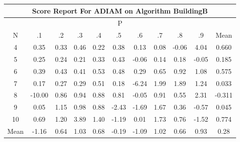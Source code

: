 \documentclass[11pt,a4paper]{report}
\begin{document}
\begin{longtable}{ | c || c | c | c | c | c | c | c | c | c || c |}
\hline
\multicolumn{11}{|c|}{ Score Report For ADIAM on Algorithm BuildingB} \\
\hline
\multicolumn{11}{|c|}{ P } \\
\hline
N & .1 & .2 & .3 & .4 & .5 & .6 & .7 & .8 & .9 & Mean\\
 \hline
 \hline
 \endhead
  4 &  \cellcolor[HTML]{F7F7FF} 0.35 &  \cellcolor[HTML]{F7F7FF} 0.33 &  \cellcolor[HTML]{F7F7FF} 0.46 &  \cellcolor[HTML]{F7F7FF} 0.22 &  \cellcolor[HTML]{F7F7FF} 0.38 &  \cellcolor[HTML]{FFFFFF} 0.13 &  \cellcolor[HTML]{FFFFFF} 0.08 &  \cellcolor[HTML]{FFFFFF} -0.06 &  \cellcolor[HTML]{9797FF} 4.04 & 0.660 \\
  5 &  \cellcolor[HTML]{F7F7FF} 0.25 &  \cellcolor[HTML]{F7F7FF} 0.24 &  \cellcolor[HTML]{F7F7FF} 0.21 &  \cellcolor[HTML]{F7F7FF} 0.33 &  \cellcolor[HTML]{F7F7FF} 0.43 &  \cellcolor[HTML]{FFFFFF} -0.06 &  \cellcolor[HTML]{FFFFFF} 0.14 &  \cellcolor[HTML]{F7F7FF} 0.18 &  \cellcolor[HTML]{FFFFFF} -0.05 & 0.185 \\
  6 &  \cellcolor[HTML]{F7F7FF} 0.39 &  \cellcolor[HTML]{F7F7FF} 0.43 &  \cellcolor[HTML]{F7F7FF} 0.41 &  \cellcolor[HTML]{EFEFFF} 0.53 &  \cellcolor[HTML]{EFEFFF} 0.48 &  \cellcolor[HTML]{F7F7FF} 0.29 &  \cellcolor[HTML]{EFEFFF} 0.65 &  \cellcolor[HTML]{E7E7FF} 0.92 &  \cellcolor[HTML]{E7E7FF} 1.08 & 0.575 \\
  7 &  \cellcolor[HTML]{F7F7FF} 0.17 &  \cellcolor[HTML]{F7F7FF} 0.27 &  \cellcolor[HTML]{F7F7FF} 0.29 &  \cellcolor[HTML]{EFEFFF} 0.51 &  \cellcolor[HTML]{F7F7FF} 0.18 &  \cellcolor[HTML]{FF6060} -6.24 &  \cellcolor[HTML]{CFCFFF} 1.99 &  \cellcolor[HTML]{CFCFFF} 1.89 &  \cellcolor[HTML]{DFDFFF} 1.24 & 0.033 \\
  8 &  \cellcolor[HTML]{FF0000} -10.00 &  \cellcolor[HTML]{E7E7FF} 0.86 &  \cellcolor[HTML]{E7E7FF} 0.94 &  \cellcolor[HTML]{E7E7FF} 0.88 &  \cellcolor[HTML]{E7E7FF} 0.81 &  \cellcolor[HTML]{FFFFFF} -0.05 &  \cellcolor[HTML]{E7E7FF} 0.91 &  \cellcolor[HTML]{EFEFFF} 0.55 &  \cellcolor[HTML]{C7C7FF} 2.31 & -0.311 \\
  9 &  \cellcolor[HTML]{FFFFFF} 0.05 &  \cellcolor[HTML]{DFDFFF} 1.15 &  \cellcolor[HTML]{E7E7FF} 0.98 &  \cellcolor[HTML]{E7E7FF} 0.88 &  \cellcolor[HTML]{FFBFBF} -2.43 &  \cellcolor[HTML]{FFD7D7} -1.69 &  \cellcolor[HTML]{D7D7FF} 1.67 &  \cellcolor[HTML]{F7F7FF} 0.36 &  \cellcolor[HTML]{FFEFEF} -0.57 & 0.045 \\
  10 &  \cellcolor[HTML]{EFEFFF} 0.69 &  \cellcolor[HTML]{DFDFFF} 1.20 &  \cellcolor[HTML]{9F9FFF} 3.89 &  \cellcolor[HTML]{DFDFFF} 1.40 &  \cellcolor[HTML]{FFDFDF} -1.19 &  \cellcolor[HTML]{FFFFFF} 0.01 &  \cellcolor[HTML]{D7D7FF} 1.73 &  \cellcolor[HTML]{EFEFFF} 0.76 &  \cellcolor[HTML]{FFD7D7} -1.52 & 0.774 \\
 \hline
 \hline
Mean &  \cellcolor[HTML]{FFDFDF} -1.16 &  \cellcolor[HTML]{EFEFFF} 0.64 &  \cellcolor[HTML]{E7E7FF} 1.03 &  \cellcolor[HTML]{EFEFFF} 0.68 &  \cellcolor[HTML]{FFF7F7} -0.19 &  \cellcolor[HTML]{FFE7E7} -1.09 &  \cellcolor[HTML]{E7E7FF} 1.02 &  \cellcolor[HTML]{EFEFFF} 0.66 &  \cellcolor[HTML]{E7E7FF} 0.93 &  \cellcolor[HTML]{F7F7FF} 0.28
\end{longtable}
\end{document}
